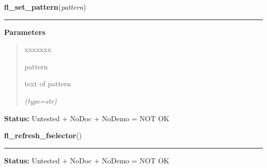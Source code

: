 \hspace{.8\funcindent}\begin{boxedminipage}{\funcwidth}

    \raggedright \textbf{fl\_set\_pattern}(\textit{pattern})

    \vspace{-1.5ex}

    \rule{\textwidth}{0.5\fboxrule}
\setlength{\parskip}{2ex}
\setlength{\parskip}{1ex}
      \textbf{Parameters}
      \vspace{-1ex}

      \begin{quote}
        \begin{Ventry}{xxxxxxx}

          \item[pattern]

          text of pattern

            {\it (type=str)}

        \end{Ventry}

      \end{quote}

\textbf{Status:} Untested + NoDoc + NoDemo = NOT OK



    \end{boxedminipage}

    \label{xformslib:flgoodies:fl_refresh_fselector}

    \vspace{0.5ex}

\hspace{.8\funcindent}\begin{boxedminipage}{\funcwidth}

    \raggedright \textbf{fl\_refresh\_fselector}()

    \vspace{-1.5ex}

    \rule{\textwidth}{0.5\fboxrule}
\setlength{\parskip}{2ex}
\setlength{\parskip}{1ex}
\textbf{Status:} Untested + NoDoc + NoDemo = NOT OK



    \end{boxedminipage}

    \label{xformslib:flgoodies:fl_add_fselector_appbutton}

